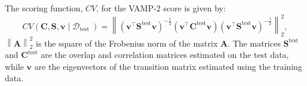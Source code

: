 The scoring function, $CV$, for the VAMP-2 score is given by:\cite{wuVariationalApproachLearning2020c}  
\begin{equation}
CV\left(\mathbf{C}, \mathbf{S}, \mathbf{v} \mid \mathcal{D}_{\text {test }}\right) 
=\left\|\left(\mathbf{v}^{\top} \mathbf{S}^{\text{test}} \mathbf{v}\right)^{-\frac{1}{2}}\left(\mathbf{v}^{\top} \mathbf{C}^{\text{test}} \mathbf{v}\right)\left(\mathbf{v}^{\top} \mathbf{S}^{\text{test}} \mathbf{v}\right)^{-\frac{1}{2}}\right\|_{2}^{2}, 
\end{equation}
$\left\| \mathbf{A}\right\|_{2}^{2}$ is the square of the Frobenius norm of the matrix $\mathbf{A}$. \cite{wuVariationalApproachLearning2020c} The matrices $\mathbf{S}^{\text{test}}$ and $\mathbf{C}^{\text{test}}$ are the overlap and correlation matrices estimated on the test data, while $\mathbf{v}$ are the eigenvectors of the transition matrix estimated using the training data. 




